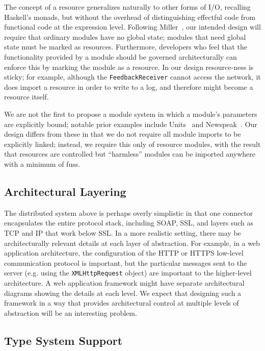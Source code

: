 \documentclass[runningheads]{llncs}
\begin{document}
\begin{sloppypar}
The concept of a resource generalizes naturally to other forms of I/O, recalling Haskell's monads, but without the overhead of distinguishing effectful code from functional code at the expression level.  Following Miller~\cite{MarkMiller-E}, our intended design will require that ordinary modules have no global state; modules that need global state must be marked as resources.  Furthermore, developers who feel that the functionality provided by a module should be governed architecturally can enforce this by marking the module as a resource.  In our design resource-ness is sticky; for example, although the \texttt{FeedbackReceiver} cannot access the network, it does import a resource in order to write to a log, and therefore might become a resource itself.

We are not the first to propose a module system in which a module's parameters are explicitly bound; notable prior examples include Units~\cite{FF98} and Newspeak~\cite{BrachaNewspeakModules}.  Our design differs from these in that we do not require all module imports to be explicitly linked; instead, we require this only of resource modules, with the result that resources are controlled but ``harmless'' modules can be imported anywhere with a minimum of fuss.

\subsection{Architectural Layering}

The distributed system above is perhaps overly simplistic in that one connector encapsulates the entire protocol stack, including SOAP, SSL, and layers such as TCP and IP that work below SSL.  In a more realistic setting, there may be architecturally relevant details at each layer of abstraction.  For example, in a web application architecture, the configuration of the HTTP or HTTPS low-level communication protocol is important, but the particular messages sent to the server (e.g. using the \texttt{XMLHttpRequest} object) are important to the higher-level architecture.  A web application framework might have separate architectural diagrams showing the details at each level.  We expect that designing such a framework in a way that provides architectural control at multiple levels of abstraction will be an interesting problem.


\subsection{Type System Support}


\end{sloppypar}
\end{document}
